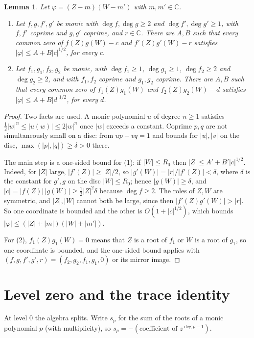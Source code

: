 \documentclass[11pt]{amsart}
\newtheorem{lemma}[theorem]{Lemma}
\theoremstyle{remark}\newtheorem{remark}[theorem]{Remark}
\theoremstyle{definition}\newtheorem{example}[theorem]{Example}
\newcommand{\C}{\mathbb{C}}
\begin{document}
\begin{lemma}\label{lem:growth}
Let $\varphi=(Z-m)(W-m')$ with $m,m'\in\C$.
\begin{enumerate}
\item Let $f,g,f',g'$ be monic with $\deg f,\deg g\ge2$ and $\deg f',\deg g'\ge1$, with $f,f'$ coprime and
$g,g'$ coprime, and $r\in\C$. There are $A,B$ such that every common zero of $f(Z)g(W)-c$ and $f'(Z)g'(W)-r$ satisfies
$|\varphi|\le A+B|c|^{1/2}$, for every $c$.
\item Let $f_1,g_1,f_2,g_2$ be monic, with $\deg f_1\ge1$, $\deg g_1\ge1$, $\deg f_2\ge2$ and $\deg g_2\ge2$, and
with $f_1,f_2$ coprime and $g_1,g_2$ coprime. There are $A,B$ such that every common zero of $f_1(Z)g_1(W)$ and
$f_2(Z)g_2(W)-d$ satisfies $|\varphi|\le A+B|d|^{1/2}$, for every $d$.
\end{enumerate}
\end{lemma}

\begin{proof}
Two facts are used. A monic polynomial $u$ of degree $n\ge1$ satisfies $\tfrac12|w|^n\le|u(w)|\le2|w|^n$ once $|w|$
exceeds a constant. Coprime $p,q$ are not simultaneously small on a disc: from $up+vq=1$ and bounds for $|u|,|v|$ on
the disc, $\max(|p|,|q|)\ge\delta>0$ there.

The main step is a one-sided bound for (1): if $|W|\le R_0$ then $|Z|\le A'+B'|c|^{1/2}$. Indeed, for $|Z|$ large,
$|f'(Z)|\ge|Z|/2$, so $|g'(W)|=|r|/|f'(Z)|<\delta$, where $\delta$ is the constant for $g',g$ on the disc
$|W|\le R_0$; hence $|g(W)|\ge\delta$, and $|c|=|f(Z)|\,|g(W)|\ge\tfrac12|Z|^2\delta$ because $\deg f\ge2$. The
roles of $Z,W$ are symmetric, and $|Z|,|W|$ cannot both be large, since then $|f'(Z)g'(W)|>|r|$. So one coordinate is
bounded and the other is $O(1+|c|^{1/2})$, which bounds $|\varphi|\le(|Z|+|m|)(|W|+|m'|)$.

For (2), $f_1(Z)g_1(W)=0$ means that $Z$ is a root of $f_1$ or $W$ is a root of $g_1$, so one coordinate is bounded,
and the one-sided bound applies with $(f,g,f',g',r)=(f_2,g_2,f_1,g_1,0)$ or its mirror image.
\end{proof}

\section{Level zero and the trace identity}\label{sec:level0}

At level $0$ the algebra splits. Write $s_p$ for the sum of the roots of a monic polynomial $p$ (with multiplicity),
so $s_p=-(\text{coefficient of }z^{\deg p-1})$.
\end{document}
